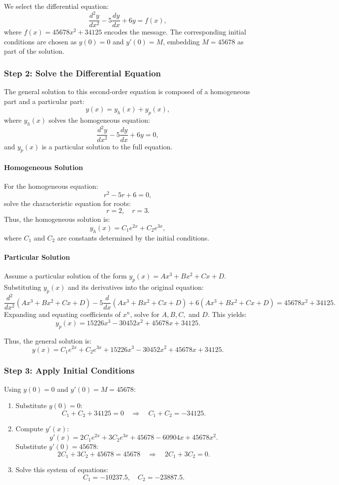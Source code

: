 \documentclass[12pt]{article}
\begin{document}
We select the differential equation:
\[
\frac{d^2y}{dx^2} - 5\frac{dy}{dx} + 6y = f(x),
\]
where \( f(x) = 45678x^2 + 34125 \) encodes the message. The corresponding initial conditions are chosen as \( y(0) = 0 \) and \( y'(0) = M \), embedding \( M = 45678 \) as part of the solution.

\subsubsection*{Step 2: Solve the Differential Equation}

The general solution to this second-order equation is composed of a homogeneous part and a particular part:
\[
y(x) = y_h(x) + y_p(x),
\]
where \( y_h(x) \) solves the homogeneous equation:
\[
\frac{d^2y}{dx^2} - 5\frac{dy}{dx} + 6y = 0,
\]
and \( y_p(x) \) is a particular solution to the full equation.

\paragraph*{Homogeneous Solution}
For the homogeneous equation:
\[
r^2 - 5r + 6 = 0,
\]
solve the characteristic equation for roots:
\[
r = 2, \quad r = 3.
\]
Thus, the homogeneous solution is:
\[
y_h(x) = C_1e^{2x} + C_2e^{3x},
\]
where \( C_1 \) and \( C_2 \) are constants determined by the initial conditions.

\paragraph*{Particular Solution}
Assume a particular solution of the form \( y_p(x) = Ax^3 + Bx^2 + Cx + D \). Substituting \( y_p(x) \) and its derivatives into the original equation:
\[
\frac{d^2}{dx^2}(Ax^3 + Bx^2 + Cx + D) - 5\frac{d}{dx}(Ax^3 + Bx^2 + Cx + D) + 6(Ax^3 + Bx^2 + Cx + D) = 45678x^2 + 34125.
\]
Expanding and equating coefficients of \( x^n \), solve for \( A, B, C, \) and \( D \). This yields:
\[
y_p(x) = 15226x^3 - 30452x^2 + 45678x + 34125.
\]

Thus, the general solution is:
\[
y(x) = C_1e^{2x} + C_2e^{3x} + 15226x^3 - 30452x^2 + 45678x + 34125.
\]

\subsubsection*{Step 3: Apply Initial Conditions}

Using \( y(0) = 0 \) and \( y'(0) = M = 45678 \):
\begin{enumerate}
    \item Substitute \( y(0) = 0 \):
    \[
    C_1 + C_2 + 34125 = 0 \quad \Rightarrow \quad C_1 + C_2 = -34125.
    \]

    \item Compute \( y'(x) \):
    \[
    y'(x) = 2C_1e^{2x} + 3C_2e^{3x} + 45678 - 60904x + 45678x^2.
    \]
    Substitute \( y'(0) = 45678 \):
    \[
    2C_1 + 3C_2 + 45678 = 45678 \quad \Rightarrow \quad 2C_1 + 3C_2 = 0.
    \]

    \item Solve this system of equations:
    \[
    C_1 = -10237.5, \quad C_2 = -23887.5.
    \]
\end{enumerate}
\end{document}
